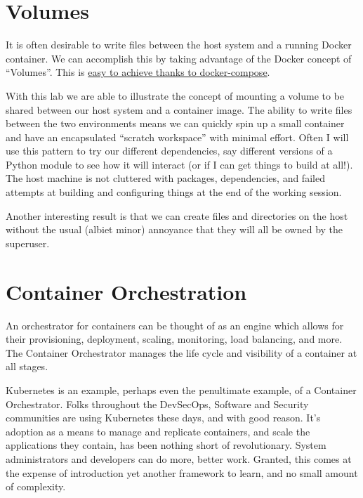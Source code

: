 \section{Volumes}

It is often desirable to write files between the host system and a running Docker container. We can accomplish this by taking advantage of the Docker concept of ``Volumes''. This is \href{https://docs.docker.com/storage/volumes/#use-a-volume-with-docker-compose}{easy to achieve thanks to docker-compose}.


\justifying
With this lab we are able to illustrate the concept of mounting a volume to be shared between our host system and a 
container image. The ability to write files between the two environments means we can quickly spin up a small container and have an
encapsulated ``scratch workspace'' with minimal effort. Often I will use this pattern to try our different dependencies, say
different versions of a Python module to see how it will interact (or if I can get things to build at all!). The host machine is
not cluttered with packages, dependencies, and failed attempts at building and configuring things at the end of the working
session.

\justifying
Another interesting result is that we can create files and directories on the host without the usual (albiet minor) annoyance
that they will all be owned by the superuser. 

\section{Container Orchestration}

\justifying
An orchestrator for containers can be thought of as an engine which allows for their provisioning, deployment, scaling, monitoring, load
balancing, and more. The Container Orchestrator manages the life cycle and visibility of a container at all stages.

\justifying
Kubernetes is an example, perhaps even the penultimate example, of a Container Orchestrator.
Folks throughout the DevSecOps, Software and Security communities are using Kubernetes these days, and
with good reason. It's adoption as a means to manage and replicate containers, and scale the applications they contain,
has been nothing short of revolutionary. System administrators and developers can do more, better work. Granted, this comes at
the expense of introduction yet another framework to learn, and no small amount of complexity.

